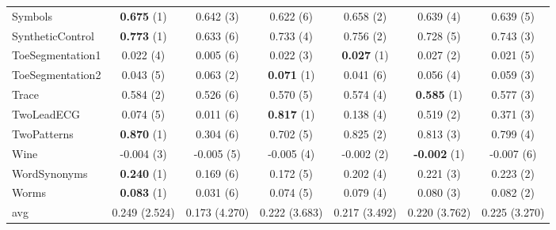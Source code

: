 \begin{table}[ht]
\begin{adjustbox}{width=\textwidth}
\begin{tabular}{lcccccc}
    Symbols & \textbf{0.675} (1) & 0.642 (3) & 0.622 (6) & 0.658 (2) & 0.639 (4) & 0.639 (5) \\
    SyntheticControl & \textbf{0.773} (1) & 0.633 (6) & 0.733 (4) & 0.756 (2) & 0.728 (5) & 0.743 (3) \\
    ToeSegmentation1 & 0.022 (4) & 0.005 (6) & 0.022 (3) & \textbf{0.027} (1) & 0.027 (2) & 0.021 (5) \\
    ToeSegmentation2 & 0.043 (5) & 0.063 (2) & \textbf{0.071} (1) & 0.041 (6) & 0.056 (4) & 0.059 (3) \\
    Trace & 0.584 (2) & 0.526 (6) & 0.570 (5) & 0.574 (4) & \textbf{0.585} (1) & 0.577 (3) \\
    TwoLeadECG & 0.074 (5) & 0.011 (6) & \textbf{0.817} (1) & 0.138 (4) & 0.519 (2) & 0.371 (3) \\
    TwoPatterns & \textbf{0.870} (1) & 0.304 (6) & 0.702 (5) & 0.825 (2) & 0.813 (3) & 0.799 (4) \\
    Wine & -0.004 (3) & -0.005 (5) & -0.005 (4) & -0.002 (2) & \textbf{-0.002} (1) & -0.007 (6) \\
    WordSynonyms & \textbf{0.240} (1) & 0.169 (6) & 0.172 (5) & 0.202 (4) & 0.221 (3) & 0.223 (2) \\
    Worms & \textbf{0.083} (1) & 0.031 (6) & 0.074 (5) & 0.079 (4) & 0.080 (3) & 0.082 (2) \\
    \hline 
    avg & 0.249 (2.524) & 0.173 (4.270) & 0.222 (3.683) & 0.217 (3.492) & 0.220 (3.762) & 0.225 (3.270) \\ 
    \hline
    \end{tabular}
    \end{adjustbox}
    \end{table}


